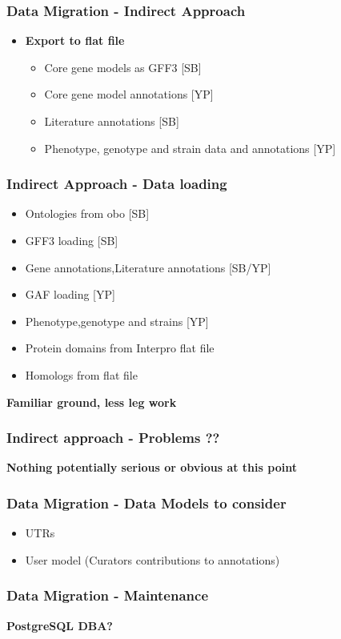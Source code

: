 \documentclass[hyperref={pdfpagelabels=false}, compress]{beamer}
\begin{document}
\begin{frame}
    \frametitle{Data Migration - Indirect Approach}
       \begin{itemize}
          \item  \textbf{\Large Export to flat file}
           \begin{itemize}
               \item Core gene models as GFF3 [SB]
               \item Core gene model annotations [YP]
               \item Literature annotations [SB]
               \item Phenotype, genotype and strain data and annotations [YP]
           \end{itemize}
          \end{itemize}
\end{frame}


\begin{frame}
  \frametitle{Indirect Approach - Data loading}
  
  \begin{itemize}
       \item Ontologies from obo [SB]
       \item GFF3 loading [SB]
       \item Gene annotations,Literature annotations [SB/YP]
       \item GAF loading [YP]
       \item Phenotype,genotype and strains [YP]
       \item Protein domains from Interpro flat file
       \item Homologs from flat file
  \end{itemize}
  \textbf{\Large Familiar ground, less leg work}
  \end{frame}
  
  \begin{frame}
    \frametitle{Indirect approach - Problems ??}  
         \textbf{\Large Nothing potentially serious or obvious at this point}
 \end{frame}

\begin{frame}
    \frametitle{Data Migration - Data Models to consider}
           \begin{itemize}
               \item UTRs
               \item User model (Curators contributions to annotations)
              \end{itemize}        
\end{frame}

\begin{frame}
   \frametitle{Data Migration - Maintenance}
   \textbf{\Huge PostgreSQL DBA?}
\end{frame}

\end{document}
